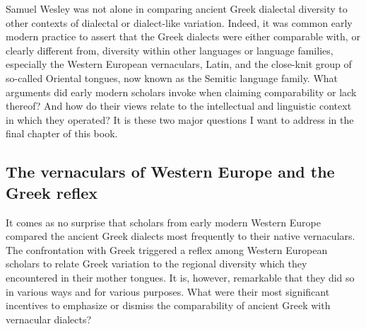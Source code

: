 \documentclass[output=paper]{langsci/langscibook}
\begin{document}
Samuel Wesley was not alone in comparing ancient Greek dialectal diversity to other contexts of dialectal or dialect-like variation. Indeed, it was common early modern practice to assert that the Greek dialects were either comparable with, or clearly different from, diversity within other languages or language families, especially the Western European vernaculars, Latin, and the close-knit group of so-called Oriental tongues, now known as the Semitic language family. What arguments did early modern scholars invoke when claiming comparability or lack thereof? And how do their views relate to the intellectual and linguistic context in which they operated? It is these two major questions I want to address in the final chapter of this book.

\subsection{The vernaculars of Western Europe and the Greek reflex}
\hypertarget{Toc19704858}{}
It comes as no surprise that scholars from early modern Western Europe compared the ancient Greek dialects most frequently to their native vernaculars. The confrontation with Greek triggered a reflex among Western European scholars to relate Greek variation to the regional diversity which they encountered in their mother tongues. It is, however, remarkable that they did so in various ways and for various purposes. What were their most significant incentives to emphasize or dismiss the comparability of ancient Greek with vernacular dialects?
\end{document}
